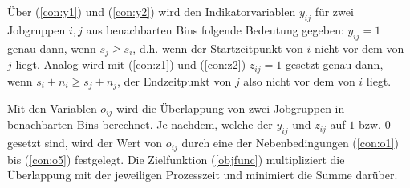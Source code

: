 \documentclass{scrreprt}
\begin{document}
Über (\ref{con:y1}) und (\ref{con:y2}) wird den Indikatorvariablen $y_{ij}$ für
zwei Jobgruppen $i,j$ aus benachbarten Bins folgende
Bedeutung gegeben: $y_{ij}=1$ genau dann, wenn $s_j \geq s_i$, d.h. wenn der Startzeitpunkt von $i$ nicht vor dem von $j$ liegt.
Analog wird mit (\ref{con:z1}) und (\ref{con:z2}) $z_{ij}=1$ gesetzt genau dann, wenn $s_i+n_i \geq s_j+n_j$, der Endzeitpunkt von $j$ also nicht vor dem von $i$ liegt.

Mit den Variablen $o_{ij}$ wird die Überlappung von zwei Jobgruppen in benachbarten Bins berechnet.
Je nachdem, welche der $y_{ij}$ und $z_{ij}$ auf $1$ bzw. $0$ gesetzt sind, 
wird der Wert von $o_{ij}$ durch eine der Nebenbedingungen (\ref{con:o1}) bis (\ref{con:o5}) festgelegt.
Die Zielfunktion (\ref{objfunc}) multipliziert die Überlappung mit der jeweiligen Prozesszeit und minimiert die Summe darüber.
\end{document}
